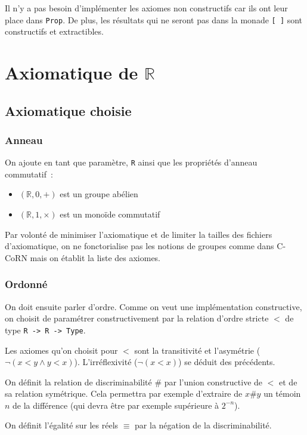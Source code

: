 \documentclass[10pt]{article}
\begin{document}
Il n'y a pas besoin d'implémenter les axiomes non constructifs car ils ont leur place dans {\tt Prop}. De plus, les résultats qui ne seront pas dans la monade {\tt [ ]} sont constructifs et extractibles.

\section{Axiomatique de $\mathbb{R}$}

\subsection{Axiomatique choisie}

\subsubsection{Anneau}

On ajoute en tant que paramètre, {\tt R} ainsi que les propriétés d'anneau commutatif~: 

\begin{itemize}
  \item $(\mathbb{R}, 0, +)$ est un groupe abélien
  \item $(\mathbb{R}, 1, \times)$ est un monoïde commutatif
\end{itemize}

Par volonté de minimiser l'axiomatique et de limiter la tailles des fichiers d'axiomatique, on ne fonctorialise pas les notions de groupes comme dans C-CoRN mais on établit la liste des axiomes.

\subsubsection{Ordonné}

On doit ensuite parler d'ordre. Comme on veut une implémentation constructive, on choisit de paramétrer constructivement par la relation d'ordre stricte $<$ de type {\tt R -> R -> Type}.

Les axiomes qu'on choisit pour $<$ sont la transitivité et l'asymétrie ($¬ (x < y \wedge y < x)$). L'irréflexivité ($¬ (x < x)$) se déduit des précédents.

On définit la relation de discriminabilité $\#$ par l'union constructive de $<$ et de sa relation symétrique. Cela permettra par exemple d'extraire de $x \# y$ un témoin $n$ de la différence (qui devra être par exemple supérieure à $2^{-n}$).

On définit l'égalité sur les réels $\equiv$ par la négation de la discriminabilité.
\end{document}
